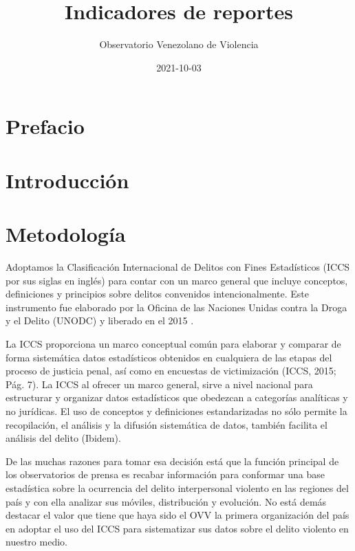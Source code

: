 \documentclass[
]{book}
\title{Indicadores de reportes}
\author{Observatorio Venezolano de Violencia}
\date{2021-10-03}
\begin{document}
\maketitle

{
\setcounter{tocdepth}{1}
\tableofcontents
}
\hypertarget{prefacio}{%
\chapter*{Prefacio}\label{prefacio}}

\hypertarget{introducciuxf3n}{%
\chapter{Introducción}\label{introducciuxf3n}}

\hypertarget{metodo}{%
\chapter{Metodología}\label{metodo}}

Adoptamos la Clasificación Internacional de Delitos con Fines Estadísticos (ICCS por sus siglas en inglés) para contar con un marco general que incluye conceptos, definiciones y principios sobre delitos convenidos intencionalmente. Este instrumento fue elaborado por la Oficina de las Naciones Unidas contra la Droga y el Delito (UNODC) y liberado en el 2015 \citep{UNODC2015}.

La ICCS proporciona un marco conceptual común para elaborar y comparar de forma sistemática datos estadísticos obtenidos en cualquiera de las etapas del proceso de justicia penal, así como en encuestas de victimización (ICCS, 2015; Pág. 7). La ICCS al ofrecer un marco general, sirve a nivel nacional para estructurar y organizar datos estadísticos que obedezcan a categorías analíticas y no jurídicas. El uso de conceptos y definiciones estandarizadas no sólo permite la recopilación, el análisis y la difusión sistemática de datos, también facilita el análisis del delito (Ibidem).

De las muchas razones para tomar esa decisión está que la función principal de los observatorios de prensa es recabar información para conformar una base estadística sobre la ocurrencia del delito interpersonal violento en las regiones del país y con ella analizar sus móviles, distribución y evolución. No está demás destacar el valor que tiene que haya sido el OVV la primera organización del país en adoptar el uso del ICCS para sistematizar sus datos sobre el delito violento en nuestro medio.
\end{document}
